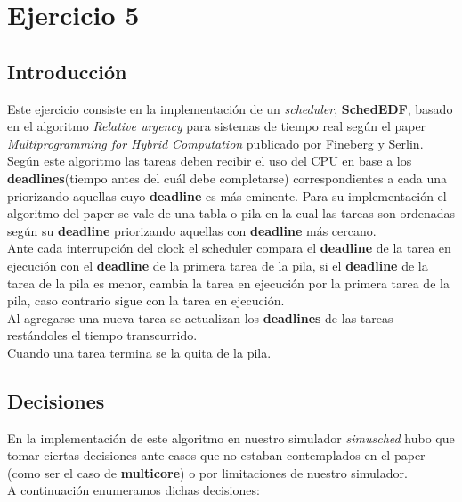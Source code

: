\section{Ejercicio 5}

\subsection{Introducción}

Este ejercicio consiste en la implementación de un \textit{scheduler}, \textbf{SchedEDF}, basado en el algoritmo \textit{Relative urgency} para sistemas de tiempo real según el paper \textit{Multiprogramming for Hybrid Computation} publicado por Fineberg y Serlin.\\

Según este algoritmo las tareas deben recibir el uso del CPU en base a los \textbf{deadlines}(tiempo antes del cuál debe completarse) correspondientes a cada una priorizando aquellas cuyo \textbf{deadline} es más eminente. Para su implementación el algoritmo del paper se vale de una tabla o pila en la cual las tareas son ordenadas según su \textbf{deadline} priorizando aquellas con \textbf{deadline} más cercano.\\
Ante cada interrupción del clock el scheduler compara el \textbf{deadline} de la tarea en ejecución con el \textbf{deadline} de la primera tarea de la pila, si el \textbf{deadline} de la tarea de la pila es menor, cambia la tarea en ejecución por la primera tarea de la pila, caso contrario sigue con la tarea en ejecución.\\
Al agregarse una nueva tarea se actualizan los \textbf{deadlines} de las tareas restándoles el tiempo transcurrido.\\
Cuando una tarea termina se la quita de la pila.

\subsection{Decisiones}

En la implementación de este algoritmo en nuestro simulador \textit{simusched} hubo que tomar ciertas decisiones ante casos que no estaban contemplados en el paper (como ser el caso de \textbf{multicore}) o por limitaciones de nuestro simulador.\\
A continuación enumeramos dichas decisiones:

